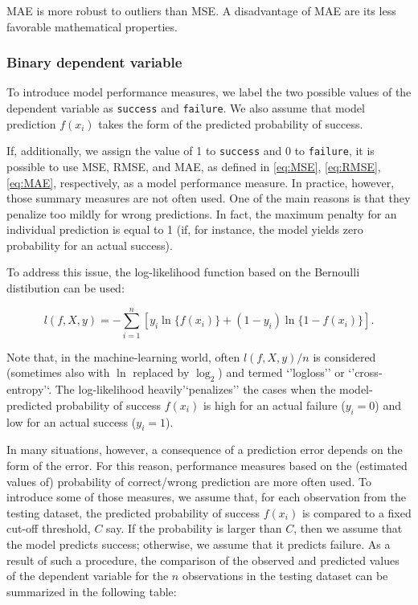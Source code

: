 \documentclass[12pt,]{krantz}
\begin{document}
MAE is more robust to outliers than MSE. A disadvantage of MAE are its less favorable mathematical properties.

\hypertarget{modelPerformanceMethodBin}{%
\subsubsection{Binary dependent variable}\label{modelPerformanceMethodBin}}

To introduce model performance measures, we label the two possible values of the dependent variable as \texttt{success} and \texttt{failure}. We also assume that model prediction \(f(x_i)\) takes the form of the predicted probability of success.

If, additionally, we assign the value of 1 to \texttt{success} and 0 to \texttt{failure}, it is possible to use MSE, RMSE, and MAE, as defined in \eqref{eq:MSE}, \eqref{eq:RMSE}, \eqref{eq:MAE}, respectively, as a model performance measure. In practice, however, those summary measures are not often used. One of the main reasons is that they penalize too mildly for wrong predictions. In fact, the maximum penalty for an individual prediction is equal to 1 (if, for instance, the model yields zero probability for an actual success).

To address this issue, the log-likelihood function based on the Bernoulli distibution can be used:

\begin{equation}
l(f, X ,y) =  -\sum_{i=1}^{n} [y_i \ln\{f(x_i)\}+ (1-y_i) \ln\{1-f(x_i)\}].
\label{eq:bernoulli}
\end{equation}

Note that, in the machine-learning world, often \(l(f, X ,y)/n\) is considered (sometimes also with \(\ln\) replaced by \(\log_2\)) and termed `'logloss'' or `'cross-entropy'`. The log-likelihood heavily'`penalizes'' the cases when the model-predicted probability of success \(f(x_i)\) is high for an actual failure (\(y_i=0\)) and low for an actual success (\(y_i=1\)).

In many situations, however, a consequence of a prediction error depends on the form of the error. For this reason, performance measures based on the (estimated values of) probability of correct/wrong prediction are more often used. To introduce some of those measures, we assume that, for each observation from the testing dataset, the predicted probability of success \(f(x_i)\) is compared to a fixed cut-off threshold, \(C\) say. If the probability is larger than \(C\), then we assume that the model predicts success; otherwise, we assume that it predicts failure. As a result of such a procedure, the comparison of the observed and predicted values of the dependent variable for the \(n\) observations in the testing dataset can be summarized in the following table:
\end{document}
